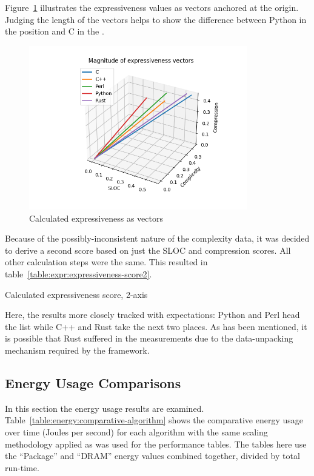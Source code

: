 Figure~\ref{fig:graph:expressiveness-arrows} illustrates the expressiveness values as vectors anchored at the origin. Judging the length of the vectors helps to show the difference between Python in the  position and C in the .

\begin{figure}[h]
	\centering
    \includegraphics[width=0.85\textwidth]{figures/expressiveness_arrows.png}
    \caption{Calculated expressiveness as vectors}
    \label{fig:graph:expressiveness-arrows}
\end{figure}

Because of the possibly-inconsistent nature of the complexity data, it was decided to derive a second score based on just the SLOC and compression scores. All other calculation steps were the same. This resulted in table~\ref{table:expr:expressiveness-score2}.

\begin{table}[!hb]

\caption{Calculated expressiveness score, 2-axis}
\label{table:expr:expressiveness-score2}
\end{table}

Here, the results more closely tracked with expectations: Python and Perl head the list while C++ and Rust take the next two places. As has been mentioned, it is possible that Rust suffered in the measurements due to the data-unpacking mechanism required by the framework.

\subsection{Energy Usage Comparisons}
\label{subsec:energy_comp}

In this section the energy usage results are examined. Table~\ref{table:energy:comparative-algorithm} shows the comparative energy usage over time (Joules per second) for each algorithm with the same scaling methodology applied as was used for the performance tables. The tables here use the ``Package'' and ``DRAM'' energy values combined together, divided by total run-time.

